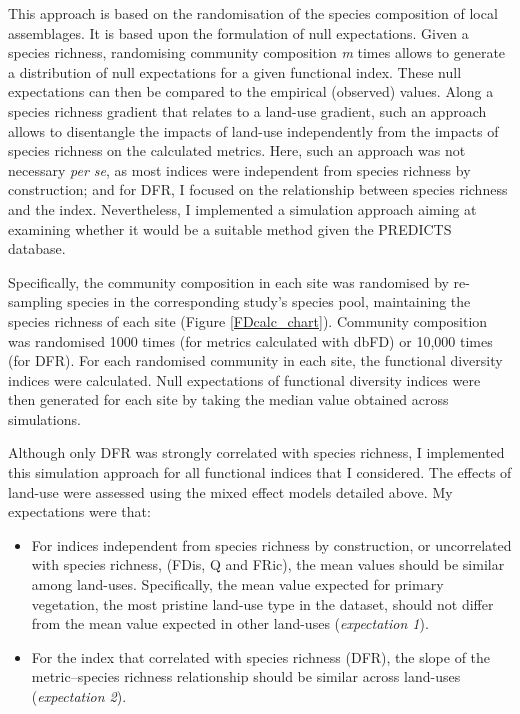 This approach is based on the randomisation of the species composition of local assemblages.  It is based upon the formulation of null expectations.  Given a species richness, randomising community composition \textit{m} times allows to generate a distribution of null expectations for a given functional index. These null expectations can then be compared to the empirical (observed) values. Along a species richness gradient that relates to a land-use gradient, such an approach allows to disentangle the impacts of land-use independently from the impacts of species richness on the calculated metrics. Here, such an approach was not necessary \textit{per se}, as most indices were independent from species richness by construction; and for DFR, I focused on the relationship between species richness and the index. Nevertheless, I implemented a simulation approach aiming at examining whether it would be a suitable method given the PREDICTS database.

Specifically, the community composition in each site was randomised by re-sampling species in the corresponding study's species pool, maintaining the species richness of each site (Figure \ref{FDcalc_chart}). Community composition was randomised 1000 times (for metrics calculated with dbFD) or 10,000 times (for DFR). For each randomised community in each site, the functional diversity indices were calculated. Null expectations of functional diversity indices were then generated for each site by taking the median value obtained across simulations.

Although only DFR was strongly correlated with species richness, I implemented this simulation approach for all functional indices that I considered. The effects of land-use were assessed using the mixed effect models detailed above. My expectations were that:
\begin{itemize}
\item For indices independent from species richness by construction, or uncorrelated with species richness, (FDis, Q and FRic), the mean values should be similar among land-uses. Specifically, the mean value expected for primary vegetation, the most pristine land-use type in the dataset, should not differ from the mean value expected in other land-uses (\textit{expectation 1}).
\item For the index that correlated with species richness (DFR), the slope of the metric--species richness relationship should be similar across land-uses (\textit{expectation 2}). 
\end{itemize} 

